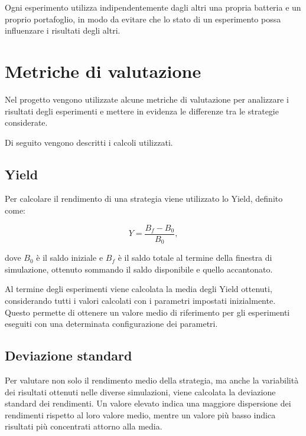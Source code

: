 \documentclass[a4paper,oneside,italian]{sapthesis}
\begin{document}
Ogni esperimento utilizza indipendentemente dagli altri una propria batteria
e un proprio portafoglio, in modo da evitare che lo stato di un esperimento
possa influenzare i risultati degli altri.



\section{Metriche di valutazione}

Nel progetto vengono utilizzate alcune metriche di valutazione per analizzare
i risultati degli esperimenti e mettere in evidenza le differenze tra le
strategie considerate.

Di seguito vengono descritti i calcoli utilizzati.


\subsection{Yield}

Per calcolare il rendimento di una strategia viene utilizzato lo Yield,
definito come:

\begin{equation}
    Y = \frac{B_f - B_0}{B_0},
\end{equation}

dove $B_0$ è il saldo iniziale e $B_f$ è il saldo totale al termine della
finestra di simulazione, ottenuto sommando il saldo disponibile e quello
accantonato.

Al termine degli esperimenti viene calcolata la media degli Yield ottenuti,
considerando tutti i valori calcolati con i parametri impostati inizialmente.
Questo permette di ottenere un valore medio di riferimento per gli esperimenti
eseguiti con una determinata configurazione dei parametri.


\subsection{Deviazione standard}

Per valutare non solo il rendimento medio della strategia, ma anche la
variabilità dei risultati ottenuti nelle diverse simulazioni, viene calcolata
la deviazione standard dei rendimenti. Un valore elevato indica una maggiore
dispersione dei rendimenti rispetto al loro valore medio, mentre un valore più
basso indica risultati più concentrati attorno alla media.
\end{document}
